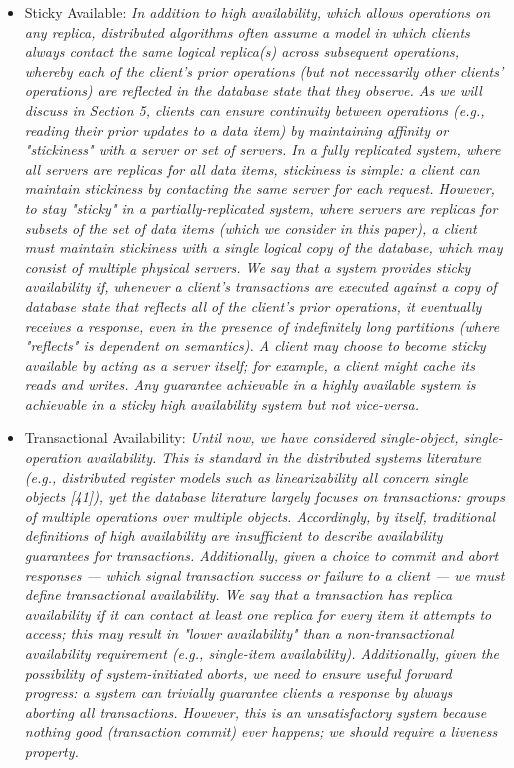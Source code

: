 \documentclass[a4paper,10pt,titlepage]{report}
\begin{document}
\begin{itemize}
        \item Sticky Available: \textit{In addition to high availability, which allows operations on any replica, distributed algorithms often assume a model in which clients always contact the same logical replica(s) across subsequent operations, whereby each of the client's prior operations (but not necessarily other clients' operations) are reflected in the database state that they observe. As we will discuss in Section 5, clients can ensure continuity between operations (e.g., reading their prior updates to a data item) by maintaining affinity or "stickiness" with a server or set of servers. In a fully replicated system, where all servers are replicas for all data items, stickiness is simple: a client can maintain stickiness by contacting the same server for each request. However, to stay "sticky" in a partially-replicated system,    where servers are replicas for subsets of the set of data items (which we consider in this paper), a client must maintain stickiness with a single logical copy of the database, which may consist of multiple physical servers. We say that a system provides sticky availability if, whenever a client's transactions are executed against a copy of database state that reflects all of the client's prior operations, it eventually receives a response, even in the presence of indefinitely long partitions (where "reflects" is dependent on semantics). A client may choose to become sticky available by acting as a server itself; for example, a client might cache its reads and writes. Any guarantee achievable in a highly available system is achievable in a sticky high availability system but not vice-versa.}\cite{HighlyAvailableTransactionsVirtuesandLimitations}
        \item Transactional Availability: \textit{Until now, we have considered single-object, single-operation availability. This is standard in the distributed systems literature    (e.g., distributed register models such as linearizability all concern single objects [41]), yet the database literature largely focuses on transactions: groups of multiple operations over multiple objects. Accordingly, by itself, traditional definitions of high availability are insufficient to describe availability guarantees for transactions. Additionally, given a choice to commit and abort responses — which signal transaction success or failure to a client — we must define transactional availability. We say that a transaction has replica availability if it can contact at least one replica for every item it attempts to access; this may result in "lower availability" than a non-transactional availability requirement (e.g., single-item availability). Additionally, given the possibility of system-initiated aborts, we need to ensure useful forward progress: a system can trivially guarantee clients a response by always aborting all transactions. However, this is an unsatisfactory system because nothing good (transaction commit) ever happens; we should require a liveness property.
}
\end{itemize}
\end{document}
